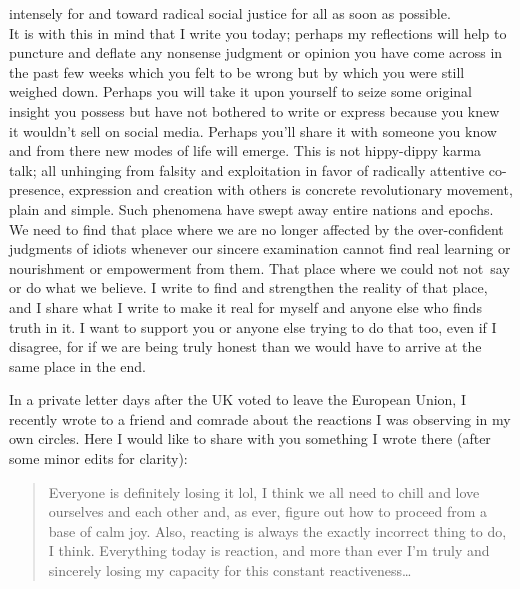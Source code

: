 \documentclass[a4paper,12pt,margin=.5in]{article}
\begin{document}
intensely for and toward radical social justice for all as soon as
possible.\\
\hspace*{0.333em} It is with this in mind that I write you today;
perhaps my reflections will help to puncture and deflate any nonsense
judgment or opinion you have come across in the past few weeks which you
felt to be wrong but by which you were still weighed down. Perhaps you
will take it upon yourself to seize some original insight you possess
but have not bothered to write or express because you knew it wouldn't
sell on social media. Perhaps you'll share it with someone you know and
from there new modes of life will emerge. This is not hippy-dippy karma
talk; all unhinging from falsity and exploitation in favor of radically
attentive co-presence, expression and creation with others is concrete
revolutionary movement, plain and simple. Such phenomena have swept away
entire nations and epochs. We need to find that place where we are no
longer affected by the over-confident judgments of idiots whenever our
sincere examination cannot find real learning or nourishment or
empowerment from them. That place where we could not not~say or do what
we believe. I write to find and strengthen the reality of that place,
and I share what I write to make it real for myself and anyone else who
finds truth in it. I want to support you or anyone else trying to do
that too, even if I disagree, for if we are being truly honest than we
would have to arrive at the same place in the end.

In a private letter days after the UK voted to leave the European Union,
I recently wrote to a friend and comrade about the reactions I was
observing in my own circles. Here I would like to share with you
something I wrote there (after some minor edits for clarity):

\begin{quote}
Everyone is definitely losing it lol, I think we all need to chill and
love ourselves and each other and, as ever, figure out how to proceed
from a base of calm joy. Also, reacting is always the exactly incorrect
thing to do, I think. Everything today is reaction, and more than ever
I'm truly and sincerely losing my capacity for this constant
reactiveness\ldots{}
\end{quote}
\end{document}
